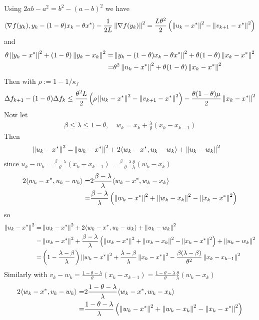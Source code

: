\documentclass[english,12pt,a4paper]{article}
\begin{document}
Using $2ab -a^2 = b^2-(a-b)^2$ we have
%
\begin{align*}
\langle\nabla f(y_k),y_k -(1-\theta)x_k -\theta x^*\rangle -\frac{1}{2L}\left\|\nabla f(y_k)\right\|^2 = \frac{L\theta^2}{2}\left( \left\|u_k -x^*\right\|^2 - \left\|v_{k+1}-x^*\right\|^2\right)
\end{align*}
%
and
%
\begin{align*}
\theta\left\|y_k-x^*\right\|^2+(1-\theta)\left\|y_k-x_k\right\|^2 =& \left\|y_k - (1-\theta)x_k - \theta x^*\right\|^2 + \theta(1-\theta)\left\|x_k-x^*\right\|^2 \\
=& \theta^2\left\|u_k-x^*\right\|^2 + \theta(1-\theta)\left\|x_k-x^*\right\|^2
\end{align*}
%
Then with $\rho := 1 - 1/\kappa_f$
%
\begin{align*}
\Delta f_{k+1} - (1-\theta) \Delta f_k \le \frac{\theta^2 L}{2}\left( \rho\left\|u_k -x^*\right\|^2 - \left\|v_{k+1} -x^*\right\|^2\right) - \frac{\theta(1-\theta)\mu}{2}\left\|x_k-x^*\right\|^2
\end{align*}
%
Now let
%
\begin{align*}
\beta \le \lambda \le 1-\theta,\quad w_k = x_k + \frac{\lambda}{\theta}(x_k-x_{k-1})
\end{align*}
%
Then
%
\begin{align*}
\left\|u_k -x^*\right\|^2 =& \left\|w_k -x^*\right\|^2 + 2\langle w_k-x^*,u_k-w_{k}\rangle + \left\|u_k-w_{k}\right\|^2
\end{align*}
%
since $u_k-w_{k} = \frac{\beta-\lambda}{\theta}(x_k-x_{k-1}) = \frac{\beta-\lambda}{\theta}\frac{\theta}{\lambda}(w_k-x_{k})$
%
\begin{align*}
2\langle w_k-x^*,u_k-w_{k}\rangle =& 2\frac{\beta-\lambda}{\lambda}\langle w_k-x^*,w_k-x_{k}\rangle\\ =& \frac{\beta-\lambda}{\lambda}\left( \left\|w_k-x^*\right\|^2 + \left\|w_k-x_{k}\right\|^2 -\left\|x_k-x^*\right\|^2 \right)
\end{align*}
%
so
%
\begin{align*}
\left\|u_k -x^*\right\|^2 =& \left\|w_k -x^*\right\|^2 + 2\langle w_k-x^*,u_k-w_{k}\rangle + \left\|u_k-w_{k}\right\|^2\\
=& \left\|w_k -x^*\right\|^2 + \frac{\beta-\lambda}{\lambda}\left( \left\|w_k-x^*\right\|^2 + \left\|w_k-x_{k}\right\|^2 -\left\|x_k-x^*\right\|^2 \right) + \left\|u_k-w_{k}\right\|^2\\
=& \left(1-\frac{\lambda-\beta}{\lambda}\right)\left\|w_k -x^*\right\|^2+\frac{\lambda-\beta}{\lambda}\left\|x_k-x^*\right\|^2 - \frac{\beta(\lambda-\beta)}{\theta^2}\left\|x_k-x_{k-1}\right\|^2
\end{align*}
%
%
Similarly with $v_k-w_{k} = \frac{1-\theta-\lambda}{\theta}(x_k-x_{k-1}) = \frac{1-\theta-\lambda}{\theta}\frac{\theta}{\lambda}(w_k-x_{k})$
%
\begin{align*}
2\langle w_k-x^*,v_k-w_{k}\rangle =& 2\frac{1-\theta-\lambda}{\lambda}\langle w_k-x^*,w_k-x_{k}\rangle\\ =& \frac{1-\theta-\lambda}{\lambda}\left( \left\|w_k-x^*\right\|^2 + \left\|w_k-x_{k}\right\|^2 -\left\|x_k-x^*\right\|^2 \right)
\end{align*}
%
\end{document}
